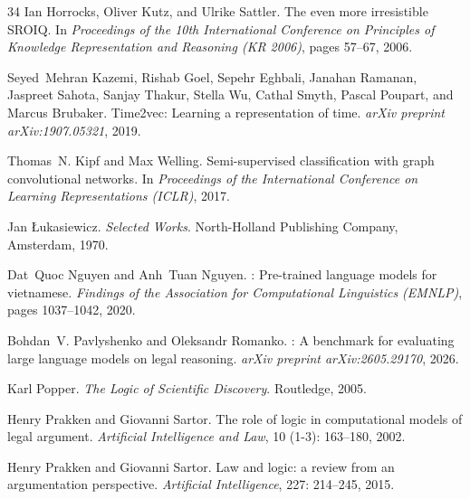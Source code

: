 \documentclass[11pt,a4paper]{article}
\begin{document}
\begin{thebibliography}{34}
Ian Horrocks, Oliver Kutz, and Ulrike Sattler.
\newblock The even more irresistible {SROIQ}.
\newblock In \emph{Proceedings of the 10th International Conference on
  Principles of Knowledge Representation and Reasoning (KR 2006)}, pages
  57--67, 2006.

Seyed~Mehran Kazemi, Rishab Goel, Sepehr Eghbali, Janahan Ramanan, Jaspreet
  Sahota, Sanjay Thakur, Stella Wu, Cathal Smyth, Pascal Poupart, and Marcus
  Brubaker.
\newblock Time2vec: Learning a representation of time.
\newblock \emph{arXiv preprint arXiv:1907.05321}, 2019.

Thomas~N. Kipf and Max Welling.
\newblock Semi-supervised classification with graph convolutional networks.
\newblock In \emph{Proceedings of the International Conference on Learning
  Representations (ICLR)}, 2017.

Jan {\L}ukasiewicz.
\newblock \emph{Selected Works}.
\newblock North-Holland Publishing Company, Amsterdam, 1970.

Dat~Quoc Nguyen and Anh~Tuan Nguyen.
: Pre-trained language models for vietnamese.
\newblock \emph{Findings of the Association for Computational Linguistics
  (EMNLP)}, pages 1037--1042, 2020.

Bohdan~V. Pavlyshenko and Oleksandr Romanko.
: A benchmark for evaluating large language models on
  legal reasoning.
\newblock \emph{arXiv preprint arXiv:2605.29170}, 2026.

Karl Popper.
\newblock \emph{The Logic of Scientific Discovery}.
\newblock Routledge, 2005.

Henry Prakken and Giovanni Sartor.
\newblock The role of logic in computational models of legal argument.
\newblock \emph{Artificial Intelligence and Law}, 10 (1-3):
  163--180, 2002.

Henry Prakken and Giovanni Sartor.
\newblock Law and logic: a review from an argumentation perspective.
\newblock \emph{Artificial Intelligence}, 227: 214--245, 2015.


\end{thebibliography}
\end{document}
